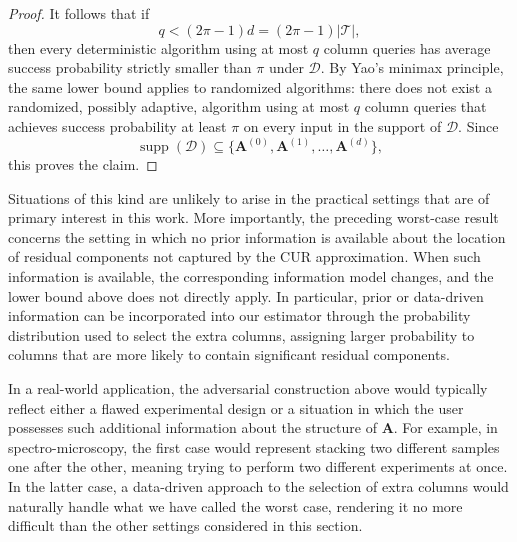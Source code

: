 \documentclass[11pt]{article}
\begin{document}
\begin{proof}
    It follows that if
    \begin{equation}
        q < (2\pi-1)d
        =
        (2\pi-1)|\mathcal{T}|,
    \end{equation}
    then every deterministic algorithm using at most $q$ column queries has
    average success probability strictly smaller than $\pi$ under
    $\mathcal{D}$. By Yao's minimax principle, the same lower bound applies to
    randomized algorithms: there does not exist a randomized, possibly adaptive,
    algorithm using at most $q$ column queries that achieves success probability
    at least $\pi$ on every input in the support of $\mathcal{D}$. Since
    $$
        \operatorname{supp}(\mathcal{D})
        \subseteq
        \{
        \mathbf{A}^{(0)},\mathbf{A}^{(1)},\ldots,\mathbf{A}^{(d)}
        \},
    $$
    this proves the claim.
\end{proof}

Situations of this kind are unlikely to arise in the practical settings that are of primary interest in this work. More importantly, the preceding worst-case result concerns the setting in which no prior information is available about the location of residual components not captured by the CUR approximation. When such information is available, the corresponding information model changes, and the lower bound above does not directly apply. In particular, prior or data-driven information can be incorporated into our estimator through the probability distribution used to select the extra columns, assigning larger probability to columns that are more likely to contain significant residual components.

In a real-world application, the adversarial construction above would typically reflect either a flawed experimental design or a situation in which the user possesses such additional information about the structure of $\mathbf{A}$. For example, in spectro-microscopy, the first case would represent stacking two different samples one after the other, meaning trying to perform two different experiments at once. In the latter case, a data-driven approach to the selection of extra columns would naturally handle what we have called the worst case, rendering it no more difficult than the other settings considered in this section.
\end{document}
